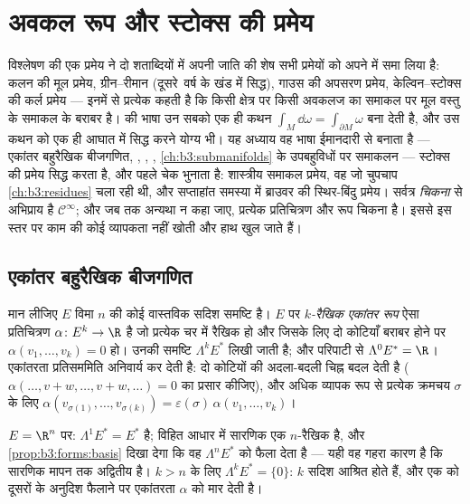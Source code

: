 \chapter{अवकल रूप और स्टोक्स की प्रमेय}\label{ch:b3:forms}

विश्लेषण की एक प्रमेय ने दो शताब्दियों में अपनी जाति की शेष सभी
प्रमेयों को अपने में समा लिया है: कलन की मूल प्रमेय, ग्रीन--रीमान
(दूसरे~वर्ष के खंड में सिद्ध), गाउस की अपसरण प्रमेय,
केल्विन--स्टोक्स की कर्ल प्रमेय --- इनमें से प्रत्येक कहती है कि
किसी क्षेत्र पर किसी अवकलज का समाकल  पर मूल वस्तु के समाकल
के बराबर है। \emph{} की भाषा उन सबको एक ही कथन $\int_M\dd\omega = \int_{\partial M}\omega$ बना
देती है, और उस कथन को एक ही आघात में सिद्ध करने योग्य भी। यह अध्याय
वह भाषा ईमानदारी से बनाता है --- एकांतर बहुरैखिक बीजगणित, , , , \cref{ch:b3:submanifolds} के उपबहुविधों पर समाकलन ---
स्टोक्स की प्रमेय सिद्ध करता है, और पहले चेक भुनाता है: शास्त्रीय
समाकल प्रमेय, वह  जो चुपचाप \cref{ch:b3:residues} चला रही थी, और
सप्ताहांत समस्या में ब्राउवर की स्थिर-बिंदु प्रमेय। सर्वत्र
\emph{चिकना} से अभिप्राय है $\mathcal
C^\infty$; और जब तक अन्यथा न कहा जाए,
प्रत्येक प्रतिचित्रण और रूप चिकना है। इससे इस स्तर पर काम की कोई
व्यापकता नहीं खोती और हाथ खुल जाते हैं।

\section{एकांतर बहुरैखिक बीजगणित}

\begin{definition}\label{def:b3:forms:alternating}
मान लीजिए $E$ विमा $n$ की कोई वास्तविक सदिश समष्टि है। $E$ पर
\emph{$k$-रैखिक एकांतर रूप} ऐसा प्रतिचित्रण
$\alpha\colon E^k \to \R$ है जो प्रत्येक चर में रैखिक हो और जिसके लिए दो कोटियाँ बराबर
होने पर $\alpha(v_1, \dots, v_k) = 0$ हो। उनकी समष्टि $\Lambda^k E^*$ लिखी जाती है; और परिपाटी से
$\Lambda^0E^* = \R$। एकांतरता प्रतिसममिति अनिवार्य कर देती है: दो कोटियों की
अदला-बदली चिह्न बदल देती है ($\alpha(\dots, v + w, \dots, v + w, \dots) = 0$ का प्रसार कीजिए), और अधिक व्यापक
रूप से प्रत्येक क्रमचय $\sigma$ के लिए $\alpha(v_{\sigma(1)}, \dots, v_{\sigma(k)}) =
\varepsilon(\sigma)\,\alpha(v_1, \dots, v_k)$।
\end{definition}

\begin{example}
$E = \R^n$ पर: $\Lambda^1E^* = E^*$  है; विहित आधार में सारणिक एक
$n$-रैखिक  है, और \cref{prop:b3:forms:basis} दिखा देगा कि वह $\Lambda^nE^*$ को फैला
देता है --- यही वह गहरा कारण है कि सारणिक मापन तक अद्वितीय है।
$k > n$ के लिए $\Lambda^kE^* = \{0\}$: $k$ सदिश आश्रित होते हैं, और एक को दूसरों के
अनुदिश फैलाने पर एकांतरता $\alpha$ को मार देती है।
\end{example}

